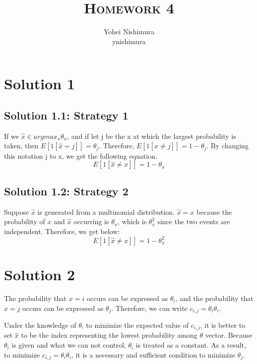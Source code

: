 \documentclass[a4paper]{article}
\title{\textsc{Homework 4}} %
\author{
	Yohei Nishimura \\
	ynishimura \\
}
\date{}
\theoremstyle{definition}
\newenvironment{soln}{
	\leavevmode\color{blue}\ignorespaces
}{}
\begin{document}
	
	\maketitle 
		
	\section*{Solution 1}
      		\subsection*{Solution 1.1: Strategy 1}
     		 \begin{soln}
		 If we $\hat{x} \in argmax_x \theta_x$, and if let j be the x at which the largest probability is taken,  then $E[1[\hat{x} = j]] = \theta_j$. Therefore, $E[1[\hat{x} \neq j]] = 1 - \theta_j$. By changing this notation j to x, we get the following equation.
 		     \[
 		     E[1[\hat{x} \neq x]] = 1 - \theta_x
 		     \]
		  \end{soln}
      
   		   \subsection*{Solution 1.2: Strategy 2}
		   \begin{soln}
  		    Suppose $\hat{x}$ is generated from a multinomial distribution. $\hat{x} = x$ because the probability of $x$ and $\hat{x}$ occurring is $\theta_x$, which is $\theta^2_x$ since the two events are independent. Therefore, we get below:
  		    \[
 		     E[1[\hat{x} \neq x]] = 1 - \theta^2_x
  		    \]
		 \end{soln}
      
      	\section*{Solution 2}
	\begin{soln}
		      The probability that $x=i$ occurs can be expressed as $\theta_i$, and the probability that $\hat{x}=j$ occurs can be expressed as $\theta_j$. Therefore, we can write $c_{i,j} = \theta_i \theta_i$.

Under the knowledge of $\theta$, to minimize the expected value of $c_{i,j}$, it is better to set $\hat{x}$ to be the index representing the lowest probability among $\theta$ vector. Because $\theta_i$ is given and what  we can not control, $\theta_i$ is treated as a constant. As a result, to minimize $c_{i,j} = \theta_i \theta_i$, it is a necessary and sufficient condition to minimize $\theta_j$.	
	\end{soln}
	
\end{document}
